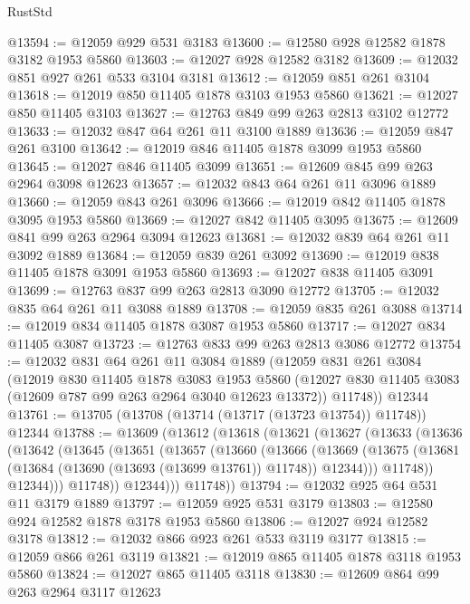 \begin{lexlean}{RustStd}
\begin{coremodule}
{\begin{coremodule}
{{{{{{{{{{{{{{{{{{{{{{{{{{{{{@13594 := @12059 @929 @531 @3183
@13600 := @12580 @928 @12582 @1878 @3182 @1953 @5860
@13603 := @12027 @928 @12582 @3182
@13609 := @12032 @851 @927 @261 @533 @3104 @3181
@13612 := @12059 @851 @261 @3104
@13618 := @12019 @850 @11405 @1878 @3103 @1953 @5860
@13621 := @12027 @850 @11405 @3103
@13627 := @12763 @849 @99 @263 @2813 @3102 @12772
@13633 := @12032 @847 @64 @261 @11 @3100 @1889
@13636 := @12059 @847 @261 @3100
@13642 := @12019 @846 @11405 @1878 @3099 @1953 @5860
@13645 := @12027 @846 @11405 @3099
@13651 := @12609 @845 @99 @263 @2964 @3098 @12623
@13657 := @12032 @843 @64 @261 @11 @3096 @1889
@13660 := @12059 @843 @261 @3096
@13666 := @12019 @842 @11405 @1878 @3095 @1953 @5860
@13669 := @12027 @842 @11405 @3095
@13675 := @12609 @841 @99 @263 @2964 @3094 @12623
@13681 := @12032 @839 @64 @261 @11 @3092 @1889
@13684 := @12059 @839 @261 @3092
@13690 := @12019 @838 @11405 @1878 @3091 @1953 @5860
@13693 := @12027 @838 @11405 @3091
@13699 := @12763 @837 @99 @263 @2813 @3090 @12772
@13705 := @12032 @835 @64 @261 @11 @3088 @1889
@13708 := @12059 @835 @261 @3088
@13714 := @12019 @834 @11405 @1878 @3087 @1953 @5860
@13717 := @12027 @834 @11405 @3087
@13723 := @12763 @833 @99 @263 @2813 @3086 @12772
@13754 := @12032
    @831
    @64
    @261
    @11
    @3084
    @1889
    (@12059
      @831
      @261
      @3084
      (@12019
        @830
        @11405
        @1878
        @3083
        @1953
        @5860
        (@12027 @830 @11405 @3083 (@12609 @787 @99 @263 @2964 @3040 @12623 @13372))
        @11748))
    @12344
@13761 := @13705 (@13708 (@13714 (@13717 (@13723 @13754)) @11748)) @12344
@13788 := @13609
    (@13612
      (@13618
        (@13621
          (@13627
            (@13633
              (@13636
                (@13642
                  (@13645
                    (@13651
                      (@13657
                        (@13660
                          (@13666
                            (@13669
                              (@13675
                                (@13681 (@13684 (@13690 (@13693 (@13699 @13761)) @11748)) @12344)))
                            @11748))
                        @12344)))
                  @11748))
              @12344)))
        @11748))
@13794 := @12032 @925 @64 @531 @11 @3179 @1889
@13797 := @12059 @925 @531 @3179
@13803 := @12580 @924 @12582 @1878 @3178 @1953 @5860
@13806 := @12027 @924 @12582 @3178
@13812 := @12032 @866 @923 @261 @533 @3119 @3177
@13815 := @12059 @866 @261 @3119
@13821 := @12019 @865 @11405 @1878 @3118 @1953 @5860
@13824 := @12027 @865 @11405 @3118
@13830 := @12609 @864 @99 @263 @2964 @3117 @12623
}}}}}}}}}}}}}}}}}}}}}}}}}}}}}
\end{coremodule}}
\end{coremodule}
\end{lexlean}

